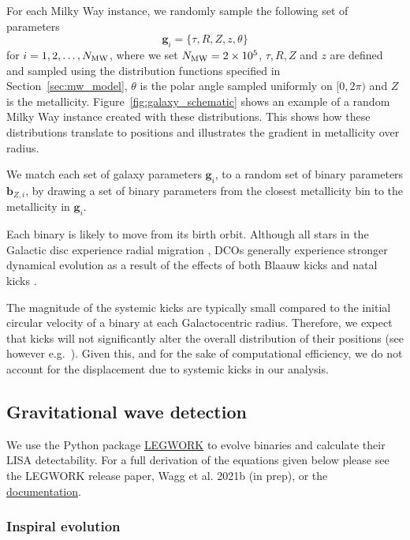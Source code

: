 For each Milky Way instance, we randomly sample the following set of parameters
\begin{equation}
    \mathbf{g}_{{i}} = \{\tau, R, Z, z, \theta\}
\end{equation}
for $i = 1, 2, \dots, N_{\rm MW}$, where we set $N_{\rm MW} = 2 \times 10^{5}$, $\tau, R, Z$ and $z$ are defined and sampled using the distribution functions specified in Section~\ref{sec:mw_model}, $\theta$ is the polar angle sampled uniformly on $[0, 2\pi)$ and $Z$ is the metallicity. Figure~\ref{fig:galaxy_schematic} shows an example of a random Milky Way instance created with these distributions. This shows how these distributions translate to positions and illustrates the gradient in metallicity over radius.

We match each set of galaxy parameters $\mathbf{g}_{{i}}$, to a random set of binary parameters $\mathbf{b}_{{Z, i}}$, by drawing a set of binary parameters from the closest metallicity bin to the metallicity in $\mathbf{g}_{{i}}$.

Each binary is likely to move from its birth orbit. Although all stars in the Galactic disc experience radial migration \citep{Sellwood+2002, Frankel+2018}, DCOs generally experience stronger dynamical evolution as a result of the effects of both Blaauw kicks \citep{Blaauw+1961} and natal kicks \citep[e.g.][]{Hobbs+2005}.

The magnitude of the systemic kicks are typically small compared to the initial circular velocity of a binary at each Galactocentric radius. Therefore, we expect that kicks will not significantly alter the overall distribution of their positions (see however e.g.\ \citealt{Brandt+1995, Abbott+2017_GW170817_progenitor}). Given this, and for the sake of computational efficiency, we do not account for the displacement due to systemic kicks in our analysis.

\subsection{Gravitational wave detection}\label{sec:gw_detection}
We use the Python package \href{https://legwork.readthedocs.io/en/latest/}{LEGWORK} to evolve binaries and calculate their LISA detectability. For a full derivation of the equations given below please see the LEGWORK release paper, Wagg et al. 2021b (in prep), or the \href{https://legwork.readthedocs.io/en/latest/notebooks/Derivations.html}{documentation}.

\subsubsection{Inspiral evolution}

